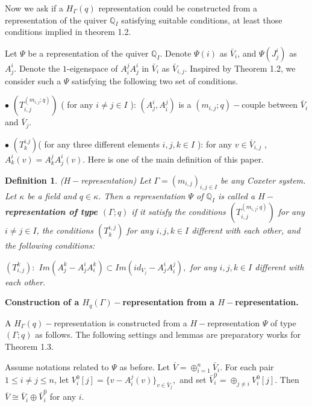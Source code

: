 \def\CTEXPreproc{Created by ctex v0.2.12, don't edit!}\documentclass[11pt]{article}
\newtheorem{defi}{Definition}[section]
\begin{document}
Now we ask if  a  $H_{\Gamma}(q)$ representation could be constructed from a representation of the quiver  $\mathbb{Q}_I$ satisfying
suitable conditions, at least those conditions implied in theorem 1.2.


 Let $\Psi$ be a representation of the quiver $\mathbb{Q}_I$. Denote $\Psi(i)$ as $\bar{V}_i$, and $\Psi(J^i _j )$ as $A^i _j$. Denote the $1$-eigenspace of $A^j _i A^i _j  $ in $\bar{V}_i $ as $\bar{V}_{i,j}$.   Inspired by Theorem 1.2, we consider such a $\Psi$ satisfying the following two set of conditions.

\noindent $\bullet$ $(T^{(m_{i,j};q)}_{i,j}) $ (  for any $i\neq j\in I$  ):  $ ( A^i _j , A^j _i )$ is a $(m_{i,j} ;q)-$couple between $\bar{V}_i $ and $\bar{V}_j$.


\noindent $\bullet$ $(T^{i.j}_k)$( for any three different elements  $i,j,k \in I$  ):  for any $v\in \bar{V}_{i,j} $ , $A^i _k (v)= A^j _k A^i _j (v) $.
Here is one of the main definition of this paper.


\begin{defi} ($H-$representation)  Let $\Gamma = ( m_{i,j} ) _{i,j \in I}$ be any Coxeter system. Let $\kappa$ be a field and $q \in \kappa$. Then
a representation  $\Psi$ of $\mathbb{Q}_{I}$ is called a \textbf{$H-$representation of type $(\Gamma;q )$} if it satisfy the conditions $(T^{(m_{i,j};q)}_{i,j})$ for any $i\neq j\in I$, the conditions $(T^{i,j} _k ) $ for any $i,j,k \in I$ different with each other, and the following conditions:

$(T^k _{i,j}):$ $Im(A^k _j -A^i _j A^k _i )\subset Im(id_{V_j} -A^i _j A^j _i ),$ for any $i,j,k \in I$ different with each other.

\end{defi}



\noindent\textbf{Construction of a $H_q (\Gamma)-$representation from a $H-$representation.}

 A $H_{\Gamma}(q)-$representation is constructed  from a  $H-$representation  $\Psi$  of type $(\Gamma;q)$ as follows. The following settings and lemmas are preparatory works for Theorem 1.3.

 Assume notations related to $\Psi$ as before.  Let $\bar{V}= \oplus^{n} _{i=1} \bar{V}_i $.  For each pair $1\leq i\neq j \leq n$, let $V^0 _i [j]=\{ v-A^j _i (v) \} _{v\in \bar{V}_j} ,$
and set $\bar{V}^{0}_i = \oplus_{j\neq i} V^0 _i [j]$.  Then  $\bar{V} \cong \bar{V}_i \oplus \bar{V}^0 _{i}$ for any $i$.
\end{document}
